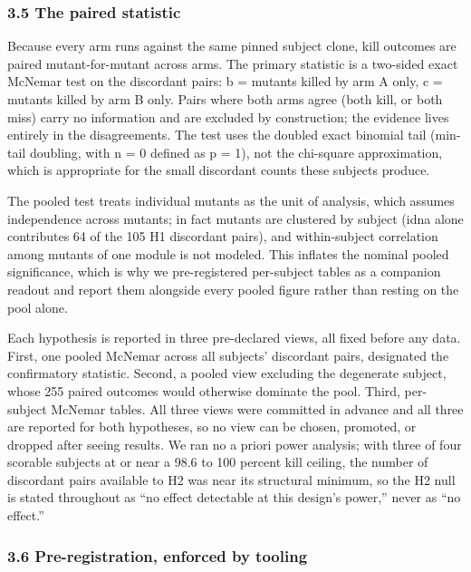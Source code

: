\documentclass[
  11pt,
]{article}
\begin{document}
\subsubsection{3.5 The paired statistic}\label{the-paired-statistic}

Because every arm runs against the same pinned subject clone, kill
outcomes are paired mutant-for-mutant across arms. The primary statistic
is a two-sided exact McNemar test on the discordant pairs: b = mutants
killed by arm A only, c = mutants killed by arm B only. Pairs where both
arms agree (both kill, or both miss) carry no information and are
excluded by construction; the evidence lives entirely in the
disagreements. The test uses the doubled exact binomial tail (min-tail
doubling, with n = 0 defined as p = 1), not the chi-square
approximation, which is appropriate for the small discordant counts
these subjects produce.

The pooled test treats individual mutants as the unit of analysis, which
assumes independence across mutants; in fact mutants are clustered by
subject (idna alone contributes 64 of the 105 H1 discordant pairs), and
within-subject correlation among mutants of one module is not modeled.
This inflates the nominal pooled significance, which is why we
pre-registered per-subject tables as a companion readout and report them
alongside every pooled figure rather than resting on the pool alone.

Each hypothesis is reported in three pre-declared views, all fixed
before any data. First, one pooled McNemar across all subjects'
discordant pairs, designated the confirmatory statistic. Second, a
pooled view excluding the degenerate subject, whose 255 paired outcomes
would otherwise dominate the pool. Third, per-subject McNemar tables.
All three views were committed in advance and all three are reported for
both hypotheses, so no view can be chosen, promoted, or dropped after
seeing results. We ran no a priori power analysis; with three of four
scorable subjects at or near a 98.6 to 100 percent kill ceiling, the
number of discordant pairs available to H2 was near its structural
minimum, so the H2 null is stated throughout as ``no effect detectable
at this design's power,'' never as ``no effect.''

\subsubsection{3.6 Pre-registration, enforced by
tooling}\label{pre-registration-enforced-by-tooling}
\end{document}
